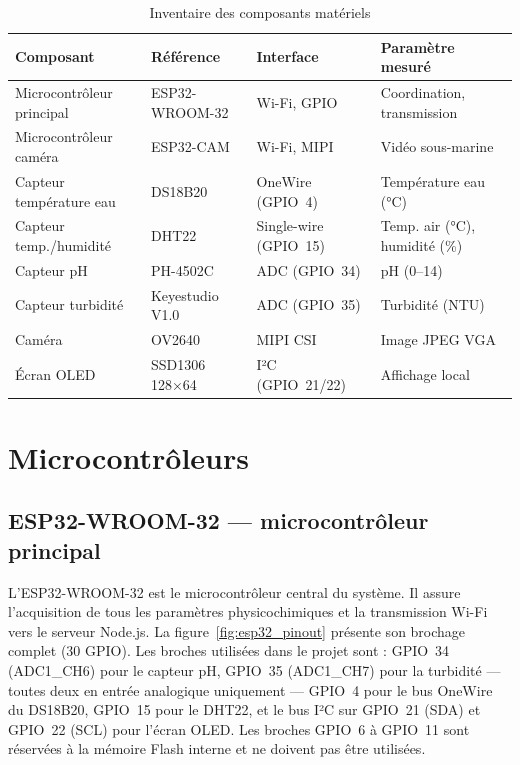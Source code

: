 \documentclass[12pt,a4paper]{report}
\begin{document}
\begin{table}[H]
\centering
\caption{Inventaire des composants matériels}
\label{tab:composants}
\begin{tabularx}{\textwidth}{@{}L{3.5cm}L{3cm}L{3cm}L{4cm}@{}}
\toprule
\textbf{Composant} & \textbf{Référence} & \textbf{Interface} & \textbf{Paramètre mesuré} \\
\midrule
Microcontrôleur principal & ESP32-WROOM-32 & Wi-Fi, GPIO & Coordination, transmission \\
Microcontrôleur caméra & ESP32-CAM & Wi-Fi, MIPI & Vidéo sous-marine \\
Capteur température eau & DS18B20 & OneWire (GPIO~4) & Température eau (°C) \\
Capteur temp./humidité & DHT22 & Single-wire (GPIO~15) & Temp. air (°C), humidité (\%) \\
Capteur pH & PH-4502C & ADC (GPIO~34) & pH (0--14) \\
Capteur turbidité & Keyestudio V1.0 & ADC (GPIO~35) & Turbidité (NTU) \\
Caméra & OV2640 & MIPI CSI & Image JPEG VGA \\
Écran OLED & SSD1306 128×64 & I²C (GPIO~21/22) & Affichage local \\
\bottomrule
\end{tabularx}
\end{table}

\section{Microcontrôleurs}

\subsection{ESP32-WROOM-32 --- microcontrôleur principal}

L'ESP32-WROOM-32 est le microcontrôleur central du système. Il assure l'acquisition
de tous les paramètres physicochimiques et la transmission Wi-Fi vers le serveur
Node.js. La figure~\ref{fig:esp32_pinout} présente son brochage complet (30 GPIO).
Les broches utilisées dans le projet sont : GPIO~34 (ADC1\_CH6) pour le capteur
pH, GPIO~35 (ADC1\_CH7) pour la turbidité --- toutes deux en entrée analogique
uniquement --- GPIO~4 pour le bus OneWire du DS18B20, GPIO~15 pour le DHT22, et
le bus I²C sur GPIO~21 (SDA) et GPIO~22 (SCL) pour l'écran OLED. Les broches
GPIO~6 à GPIO~11 sont réservées à la mémoire Flash interne et ne doivent pas
être utilisées.
\end{document}
